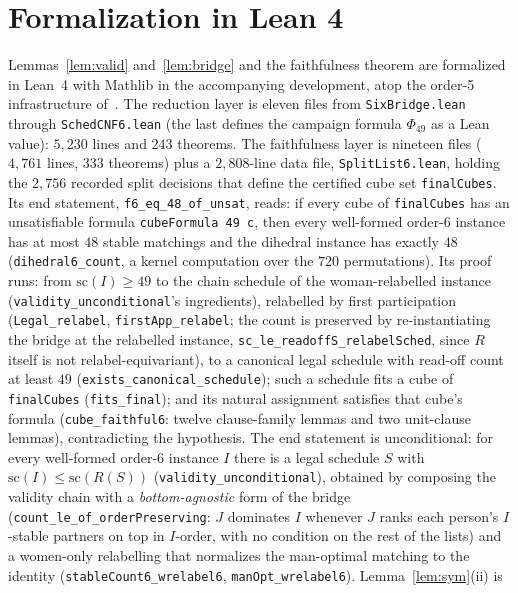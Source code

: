 \documentclass[11pt]{article}
\begin{document}
\section{Formalization in Lean 4}\label{sec:lean}

Lemmas~\ref{lem:valid} and~\ref{lem:bridge} and the faithfulness theorem are formalized in
Lean~4 with Mathlib in the accompanying development, atop the order-5 infrastructure
of~\cite{f5paper}. The reduction layer is eleven files from \texttt{SixBridge.lean} through
\texttt{SchedCNF6.lean} (the last defines the campaign formula $\Phi_{49}$ as a Lean value):
$5{,}230$ lines and $243$ theorems. The faithfulness layer is nineteen files ($4{,}761$ lines,
$333$ theorems) plus a $2{,}808$-line data file, \texttt{SplitList6.lean}, holding the $2{,}756$
recorded split decisions that define the certified cube set \texttt{finalCubes}. Its end
statement, \texttt{f6\_eq\_48\_of\_unsat}, reads: if every cube of \texttt{finalCubes} has an
unsatisfiable formula \texttt{cubeFormula 49 c}, then every well-formed order-6 instance has at
most $48$ stable matchings and the dihedral instance has exactly $48$
(\texttt{dihedral6\_count}, a kernel computation over the $720$ permutations). Its proof runs:
from $\mathrm{sc}(I)\ge 49$ to the chain schedule of the woman-relabelled instance
(\texttt{validity\_unconditional}'s ingredients), relabelled by first participation
(\texttt{Legal\_relabel}, \texttt{firstApp\_relabel}; the count is preserved by re-instantiating
the bridge at the relabelled instance, \texttt{sc\_le\_readoffS\_relabelSched}, since $R$ itself
is not relabel-equivariant), to a canonical legal schedule with read-off count at least $49$
(\texttt{exists\_canonical\_schedule}); such a schedule fits a cube of \texttt{finalCubes}
(\texttt{fits\_final}); and its natural assignment satisfies that cube's formula
(\texttt{cube\_faithful6}: twelve clause-family lemmas and two unit-clause lemmas), contradicting
the hypothesis. The end statement is
unconditional: for every well-formed order-6
instance $I$ there is a legal schedule $S$ with $\mathrm{sc}(I)\le\mathrm{sc}(R(S))$
(\texttt{validity\_unconditional}), obtained by composing the validity chain with a
\emph{bottom-agnostic} form of the bridge (\texttt{count\_le\_of\_orderPreserving}:
$J$ dominates $I$ whenever $J$ ranks each person's $I$-stable partners on top in
$I$-order, with no condition on the rest of the lists) and a women-only relabelling that
normalizes the man-optimal matching to the identity
(\texttt{stableCount6\_wrelabel6}, \texttt{manOpt\_wrelabel6}). Lemma~\ref{lem:sym}(ii) is
\end{document}
